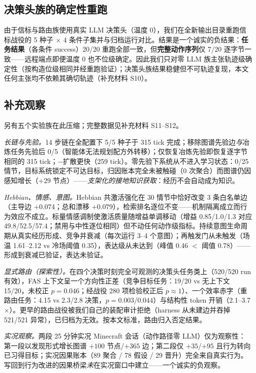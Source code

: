 \documentclass[10pt,a4paper]{ctexart}
\begin{document}
\subsection{决策头族的确定性重跑}
\label{sec:res-rerun}
由于信标与路由族使用真实 LLM 决策头（温度 0），我们在全新输出目录重跑信标战役的 5 种子 $\times$ 4 条件子集并与归档运行对比。结果是一个诚实的负结果：\textbf{任务结果}（各条件 success）20/20 重跑全部一致，但\textbf{完整动作序列}仅 7/20 逐字节一致——远程端点即便温度 0 也不位级确定。因此我们只对零 LLM 族主张轨迹级确定性（按构造位级相同并经重跑验证）；决策头族结果稳健但不可轨迹复现，本文任何主张均不依赖其确切轨迹（补充材料 S10）。

\subsection{补充观察}
\label{sec:res-system}
另有五个实验族在此压缩；完整数据见补充材料 S11--S12。

\emph{长链与先验。}14 步链在全配置下 5/5 种子于 315 tick 完成；移除图谱先验边\emph{与}冶炼任务先验后 0/5（智能体无法规划配方外转移）；仅恢复冶炼先验即恢复逐字节相同的 315 tick；$-$扩散更快（259 tick）。零先验下系统从不进入学习状态：0/25 情节，目标系统锁定不可达目标，归因账本完全未被触碰（0 次聚合）而图谱仍因感知增长（$+29$ 节点）——\emph{支架化的接地知识获取}：经历不会自动成为知识。

\emph{Hebbian、情感、意图。}Hebbian 共激活强化在 30 情节中恰好改变 3 条白名单边（主导边 $+0.074$；总和漂移 $+0.079$），检索排名逐位不变——机制隔离成立而行为效应不成立。标量情感调制使激活质量随增益单调移动（增益 0.85/1.0/1.3 对应 49.8/52.5/57.4；禁用与中性逐位相同）但不动任何动作级指标。持续意图生命周期从真实经历形成、竞争并衰减（每次运行 3--4 个意图）；再触发门从未触发（场温 1.61--2.12 vs 冷场阈值 0.35），表达级从未达到（峰值 0.46 $<$ 阈值 0.78）——形成到衰减已验证，表达未验证。

\emph{显式路由（探索性）。}在四个决策时刻完全可观测的决策头任务类上（520/520 run 有效），FAS 上下文呈一个方向性正差（竞争目标任务：19/20 vs 无上下文 15/20，未校正 $p{=}0.046$；经战役 280 项检验校正后 $p{\approx}1$）、一个效率赤字（重路由任务：4.15 vs 2.3/2.8 决策，$p{=}0.003$/$0.044$）与结构性 token 开销（2.1--3.7$\times$）。更早的路由战役被我们自己的装配审计拒绝（harness 从未建边并吞掉 521/521 异常），已归档为无效。按本文标准，路由归入否定结果。

\emph{实况观察。}两段 25 分钟实况 Minecraft 会话（动作路径零 LLM）仅为观察性：第一段以发现形式增长图谱 $+100$ 节点/$+365$ 边；第二段仅 $+35$/$+95$ 且行为转向已习得目标；实况因果账本（89 聚合 / 78 假设 / 29 晋升）完全来自真实行为。写回到行为改进的因果桥梁\emph{未}在实况窗口中建立——一个诚实的负观察。
\end{document}
